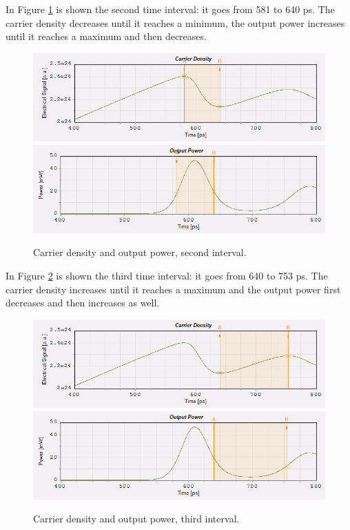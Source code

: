 \documentclass[a4paper,10pt]{report}
\begin{document}
In Figure \ref{4_2} is shown the second time interval: it goes from 581 to 640 ps.
The carrier density decreases until it reaches a minimum, the output power increases until it reaches a maximum and then decreases.
\begin{figure}[!ht]
  \centering
  \includegraphics[width=12cm]{4_2cd.png}\\
  \includegraphics[width=12cm]{4_2pw.png}\\
  \caption{Carrier density and output power, second interval.}
  \label{4_2}
\end{figure}

In Figure \ref{4_3} is shown the third time interval: it goes from 640 to 753 ps.
The carrier density increases until it reaches a maximum and the output power first decreases and then increases as well.
\begin{figure}[!ht]
  \centering
  \includegraphics[width=12cm]{4_3cd.png}\\
  \includegraphics[width=12cm]{4_3pw.png}\\
  \caption{Carrier density and output power, third interval.}
  \label{4_3}
\end{figure}
\end{document}
